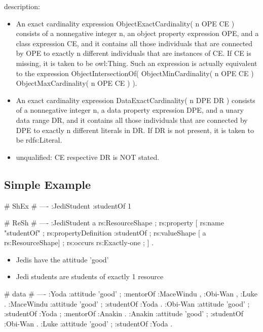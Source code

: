 \documentclass{llncs}
\newcommand{\tb}[1]{\todo[size=\small, color=blue!40]{\textbf{Thomas:} #1}}
\begin{document}
description:

\begin{itemize}
	\item An exact cardinality expression ObjectExactCardinality( n OPE CE ) consists of a nonnegative integer n, an object property expression OPE, and a class expression CE, and it contains all those individuals that are connected by OPE to exactly n different individuals that are instances of CE. If CE is missing, it is taken to be owl:Thing. Such an expression is actually equivalent to the expression ObjectIntersectionOf( ObjectMinCardinality( n OPE CE ) ObjectMaxCardinality( n OPE CE ) ).
	\item An exact cardinality expression DataExactCardinality( n DPE DR ) consists of a nonnegative integer n, a data property expression DPE, and a unary data range DR, and it contains all those individuals that are connected by DPE to exactly n different literals in DR. If DR is not present, it is taken to be rdfs:Literal. 
	\item unqualified: CE respective DR is NOT stated. 
\end{itemize}

\subsection{Simple Example}

\tb{ToDo. OWL 2 DL}

\begin{ex}
# ShEx
# ----
:JediStudent {
    :studentOf {}{1} }
\end{ex}

\begin{ex}
# ReSh
# ----
:JediStudent a rs:ResourceShape ;
    rs:property [
        rs:name "studentOf" ;
        rs:propertyDefinition :studentOf ;
        rs:valueShape [ a rs:ResourceShape] ;
        rs:occurs rs:Exactly-one ; ] .
\end{ex}

\begin{itemize}
	\item Jedis have the attitude 'good'
	\item Jedi students are students of exactly 1 resource
\end{itemize}

\begin{ex}
# data
# ----
:Yoda 
    :attitude 'good' ;
    :mentorOf :MaceWindu , :Obi-Wan , :Luke .
:MaceWindu
    :attitude 'good' ;
    :studentOf :Yoda .
:Obi-Wan 
    :attitude 'good' ;
    :studentOf :Yoda ;
    :mentorOf :Anakin .
:Anakin
    :attitude 'good' ; 
    :studentOf :Obi-Wan .
:Luke
    :attitude 'good' ;
    :studentOf :Yoda .
\end{ex}
\end{document}
